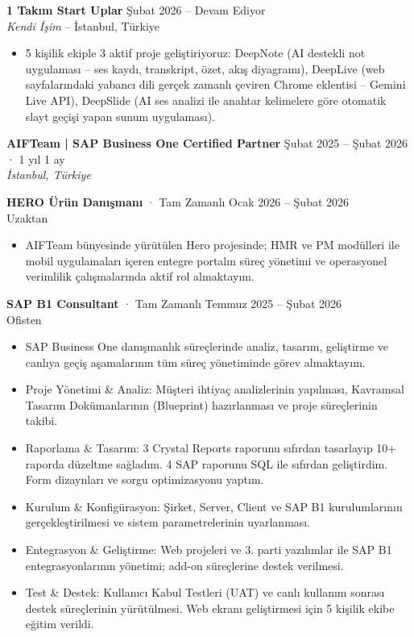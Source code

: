 \documentclass[a4paper,8pt]{article}
\begin{document}
\textbf{1 Takım Start Uplar} \hfill {\small Şubat 2026 -- Devam Ediyor}\\
{\small \textit{Kendi İşim} -- İstanbul, Türkiye}
\begin{itemize}
\item {\small 5 kişilik ekiple 3 aktif proje geliştiriyoruz: DeepNote (AI destekli not uygulaması -- ses kaydı, transkript, özet, akış diyagramı), DeepLive (web sayfalarındaki yabancı dili gerçek zamanlı çeviren Chrome eklentisi -- Gemini Live API), DeepSlide (AI ses analizi ile anahtar kelimelere göre otomatik slayt geçişi yapan sunum uygulaması).}
\end{itemize}

\vspace{3pt}

\textbf{AIFTeam | SAP Business One Certified Partner} \hfill {\small Şubat 2025 -- Şubat 2026 · 1 yıl 1 ay}\\
{\small \textit{İstanbul, Türkiye}}

\vspace{3pt}
{\small \textbf{HERO Ürün Danışmanı} · Tam Zamanlı \hfill Ocak 2026 -- Şubat 2026}\\
{\small Uzaktan}
\begin{itemize}
\item {\small AIFTeam bünyesinde yürütülen Hero projesinde; HMR ve PM modülleri ile mobil uygulamaları içeren entegre portalın süreç yönetimi ve operasyonel verimlilik çalışmalarında aktif rol almaktayım.}
\end{itemize}

\vspace{3pt}
{\small \textbf{SAP B1 Consultant} · Tam Zamanlı \hfill Temmuz 2025 -- Şubat 2026}\\
{\small Ofisten}
\begin{itemize}
\item {\small SAP Business One danışmanlık süreçlerinde analiz, tasarım, geliştirme ve canlıya geçiş aşamalarının tüm süreç yönetiminde görev almaktayım.}
\item {\small Proje Yönetimi \& Analiz: Müşteri ihtiyaç analizlerinin yapılması, Kavramsal Tasarım Dokümanlarının (Blueprint) hazırlanması ve proje süreçlerinin takibi.}
\item {\small Raporlama \& Tasarım: 3 Crystal Reports raporunu sıfırdan tasarlayıp 10+ raporda düzeltme sağladım. 4 SAP raporunu SQL ile sıfırdan geliştirdim. Form dizaynları ve sorgu optimizasyonu yaptım.}
\item {\small Kurulum \& Konfigürasyon: Şirket, Server, Client ve SAP B1 kurulumlarının gerçekleştirilmesi ve sistem parametrelerinin uyarlanması.}
\item {\small Entegrasyon \& Geliştirme: Web projeleri ve 3. parti yazılımlar ile SAP B1 entegrasyonlarının yönetimi; add-on süreçlerine destek verilmesi.}
\item {\small Test \& Destek: Kullanıcı Kabul Testleri (UAT) ve canlı kullanım sonrası destek süreçlerinin yürütülmesi. Web ekranı geliştirmesi için 5 kişilik ekibe eğitim verildi.}
\end{itemize}
\end{document}
